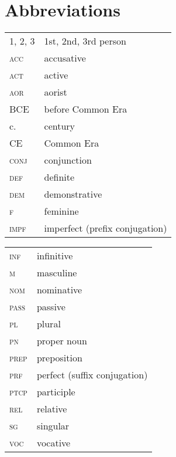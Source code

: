 \documentclass[output=paper]{langsci/langscibook}
\begin{document}
\section*{Abbreviations}

\begin{tabularx}{.5\textwidth}{@{}lQ@{}}
\textsc{1, 2, 3} & 1st, 2nd, 3rd person \\
\textsc{acc} & accusative \\
\textsc{act} & active \\
\textsc{aor} & aorist \\
BCE & before Common Era \\
c. & century \\
CE & Common Era \\
\textsc{conj} & conjunction \\
\textsc{def} & definite \\
\textsc{dem} & demonstrative \\
\textsc{f} & feminine \\
\textsc{impf} & imperfect (prefix conjugation) \\
\end{tabularx}%
\begin{tabularx}{.5\textwidth}{@{}lQ@{}}
\textsc{inf} & infinitive \\
\textsc{m} & masculine \\
\textsc{nom} & nominative \\
\textsc{pass} & passive \\
\textsc{pl} & plural \\
\textsc{pn} & proper noun \\
\textsc{prep} & preposition \\
\textsc{prf} & perfect (suffix conjugation) \\
\textsc{ptcp} & participle \\
\textsc{rel} & relative \\
\textsc{sg} & singular \\
\textsc{voc} & vocative \\
\end{tabularx}%


\sloppy
\printbibliography[heading=subbibliography,notkeyword=this] 
\end{document}

